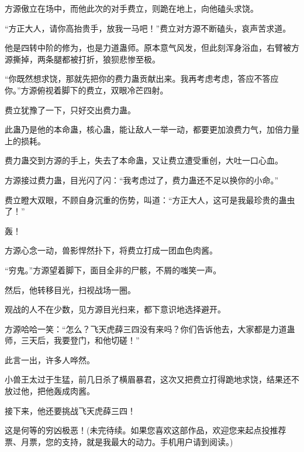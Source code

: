 \begin{this_body}
方源傲立在场中，而他此次的对手费立，则跪在地上，向他磕头求饶。

“方正大人，请你高抬贵手，放我一马吧！”费立对方源不断磕头，哀声苦求道。

他是四转中阶的修为，也是力道蛊师。原本意气风发，但此刻浑身浴血，右臂被方源撕掉，两条腿都被打折，狼狈悲惨至极。

“你既然想求饶，那就先把你的费力蛊贡献出来。我再考虑考虑，答应不答应你。”方源俯视着脚下的费立，双眼冷芒四射。

费立犹豫了一下，只好交出费力蛊。

此蛊乃是他的本命蛊，核心蛊，能让敌人一举一动，都要更加浪费力气，加倍力量上的损耗。

费力蛊交到方源的手上，失去了本命蛊，又让费立遭受重创，大吐一口心血。

方源接过费力蛊，目光闪了闪：“我考虑过了，费力蛊还不足以换你的小命。”

费立瞪大双眼，不顾自身沉重的伤势，叫道：“方正大人，这可是我最珍贵的蛊虫了！”

轰！

方源心念一动，兽影悍然扑下，将费立打成一团血色肉酱。

“穷鬼。”方源望着脚下，面目全非的尸骸，不屑的嗤笑一声。

然后，他转移目光，扫视战场一圈。

观战的人不在少数，见方源目光扫来，都下意识地选择避开。

方源哈哈一笑：“怎么？飞天虎薛三四没有来吗？你们告诉他去，大家都是力道蛊师，三天后，我要登门，和他切磋！”

此言一出，许多人哗然。

小兽王太过于生猛，前几日杀了横眉暴君，这次又把费立打得跪地求饶，结果还不放过他，把他轰成肉酱。

接下来，他还要挑战飞天虎薛三四！

这是何等的穷凶极恶！(未完待续。如果您喜欢这部作品，欢迎您来起点投推荐票、月票，您的支持，就是我最大的动力。手机用户请到阅读。)

\end{this_body}

